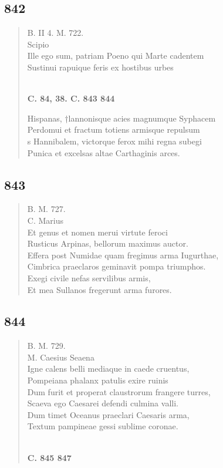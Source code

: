 \documentclass[11pt, a4paper]{report}
\begin{document}
            \subsection*{842}
      \begin{verse}
      B. II 4. M. 722. \\ Scipio \\ Ille ego sum, patriam Poeno qui Marte cadentem \\ Sustinui rapuique feris ex hostibus urbes \\ 
        ﻿\pagebreak 
    \begin{center} \textbf{C. 84, 38. C. 843 844} \end{center} \marginpar{[305]} Hispanas, †lannonisque acies magnumque Syphacem \\ Perdomui et fractum totiens armisque repulsum \\ s Hannibalem, victorque ferox mihi regna subegi \\ Punica et excelsas altae Carthaginis arces. \\ 
      \end{verse}
  
            \subsection*{843}
      \begin{verse}
      B. M. 727. \\ C. Marius \\ Et genus et nomen merui virtute feroci \\ Rusticus Arpinas, bellorum maximus auctor. \\ Effera post Numidae quam fregimus arma Iugurthae, \\ Cimbrica praeclaros geminavit pompa triumphos. \\ Exegi civile nefas servilibus armis, \\ Et mea Sullanos fregerunt arma furores. \\ 
      \end{verse}
  
            \subsection*{844}
      \begin{verse}
      B. M. 729. \\ M. Caesius Seaena \\ Igne calens belli mediaque in caede cruentus, \\ Pompeiana phalanx patulis exire ruinis \\ Dum furit et properat claustrorum frangere turres, \\ Scaeva ego Caesarei defendi culmina valli. \\ Dum timet Oceanus praeclari Caesaris arma, \\ Textum pampineae gessi sublime coronae. \\ 
        ﻿\pagebreak 
    \begin{center} \textbf{C. 845 847} \end{center} \marginpar{[306]} 
      \end{verse}
  
\end{document}
